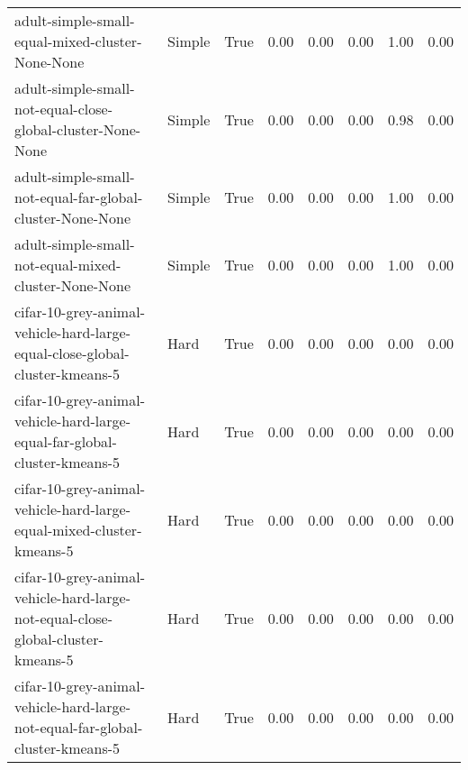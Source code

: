 \begin{longtable}{llllllll}
                                       adult-simple-small-equal-mixed-cluster-None-None &       Simple &        True &                 0.00 &                 0.00 &                         0.00 &                         1.00 &                         0.00 \\
                            adult-simple-small-not-equal-close-global-cluster-None-None &       Simple &        True &                 0.00 &                 0.00 &                         0.00 &                         0.98 &                         0.00 \\
                              adult-simple-small-not-equal-far-global-cluster-None-None &       Simple &        True &                 0.00 &                 0.00 &                         0.00 &                         1.00 &                         0.00 \\
                                   adult-simple-small-not-equal-mixed-cluster-None-None &       Simple &        True &                 0.00 &                 0.00 &                         0.00 &                         1.00 &                         0.00 \\
            cifar-10-grey-animal-vehicle-hard-large-equal-close-global-cluster-kmeans-5 &         Hard &        True &                 0.00 &                 0.00 &                         0.00 &                         0.00 &                         0.00 \\
              cifar-10-grey-animal-vehicle-hard-large-equal-far-global-cluster-kmeans-5 &         Hard &        True &                 0.00 &                 0.00 &                         0.00 &                         0.00 &                         0.00 \\
                   cifar-10-grey-animal-vehicle-hard-large-equal-mixed-cluster-kmeans-5 &         Hard &        True &                 0.00 &                 0.00 &                         0.00 &                         0.00 &                         0.00 \\
        cifar-10-grey-animal-vehicle-hard-large-not-equal-close-global-cluster-kmeans-5 &         Hard &        True &                 0.00 &                 0.00 &                         0.00 &                         0.00 &                         0.00 \\
          cifar-10-grey-animal-vehicle-hard-large-not-equal-far-global-cluster-kmeans-5 &         Hard &        True &                 0.00 &                 0.00 &                         0.00 &                         0.00 &                         0.00 \\

\end{longtable}
